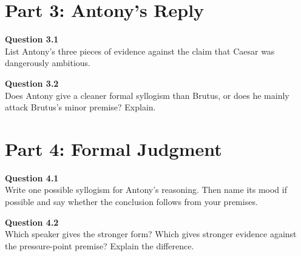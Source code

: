 \documentclass[12pt]{article}
\begin{document}
\section*{Part 3: Antony's Reply}

\textbf{Question 3.1}\\[-0.15em]
List Antony's three pieces of evidence against the claim that Caesar was dangerously ambitious.


\textbf{Question 3.2}\\[-0.15em]
Does Antony give a cleaner formal syllogism than Brutus, or does he mainly attack Brutus's minor premise? Explain.


\newpage

\section*{Part 4: Formal Judgment}

\textbf{Question 4.1}\\[-0.15em]
Write one possible syllogism for Antony's reasoning. Then name its mood if possible and say whether the conclusion follows from your premises.


\textbf{Question 4.2}\\[-0.15em]
Which speaker gives the stronger form? Which gives stronger evidence against the pressure-point premise? Explain the difference.

\end{document}
